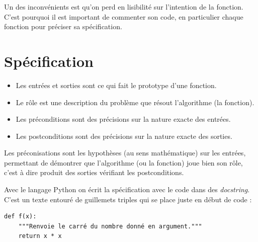 Un des inconvénients est qu'on perd en lisibilité sur l'intention de la fonction. C'est pourquoi il est important de commenter son code, en particulier chaque fonction pour préciser sa spécification.

\section{Spécification}

\begin{itemize}
	\item Les entrées et sorties sont ce qui fait le prototype d'une fonction.

	\item Le rôle est une description du problème que résout l'algorithme (la fonction).

	\item Les préconditions sont des précisions sur la nature exacte des entrées.

	\item Les postconditions sont des précisions sur la nature exacte des sorties.
\end{itemize}


Les préconisations sont les hypothèses (au sens mathématique) sur les entrées, permettant de démontrer que l'algorithme (ou la fonction) joue bien son rôle, c'est à dire produit des sorties vérifiant les postconditions.

\medskip

Avec le langage Python on écrit la spécification avec le code dans des \emph{docstring}. C'est un texte entouré de guillemets triples qui se place juste en début de code :

  
  \vspace{-2ex}
\begin{verbatim}
def f(x):
    """Renvoie le carré du nombre donné en argument."""
    return x * x
\end{verbatim}

